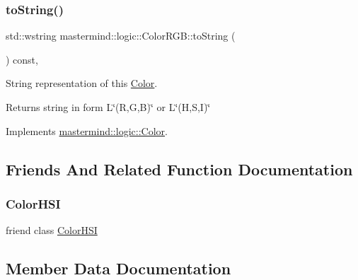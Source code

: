\subsubsection{\texorpdfstring{to\+String()}{toString()}}
{\footnotesize\ttfamily std\+::wstring mastermind\+::logic\+::\+Color\+R\+G\+B\+::to\+String (\begin{DoxyParamCaption}{ }\end{DoxyParamCaption}) const\hspace{0.3cm}{\ttfamily [override]}, {\ttfamily [virtual]}}



String representation of this \hyperlink{classmastermind_1_1logic_1_1_color}{Color}. 

\begin{DoxyReturn}{Returns}
string in form {\ttfamily L\char`\"{}(\+R,\+G,\+B)\char`\"{}} or {\ttfamily L\char`\"{}(\+H,\+S,\+I)\char`\"{}} 
\end{DoxyReturn}


Implements \hyperlink{classmastermind_1_1logic_1_1_color_ab911e1ca9d820b7d97c8e014ff75bc49}{mastermind\+::logic\+::\+Color}.



\subsection{Friends And Related Function Documentation}
\hypertarget{classmastermind_1_1logic_1_1_color_r_g_b_ada143533c2a424e783d7a68a213d6537}{}\label{classmastermind_1_1logic_1_1_color_r_g_b_ada143533c2a424e783d7a68a213d6537} 
\subsubsection{\texorpdfstring{Color\+H\+SI}{ColorHSI}}
{\footnotesize\ttfamily friend class \hyperlink{classmastermind_1_1logic_1_1_color_h_s_i}{Color\+H\+SI}\hspace{0.3cm}{\ttfamily [friend]}}



\subsection{Member Data Documentation}
\hypertarget{classmastermind_1_1logic_1_1_color_r_g_b_a9bfa135c10da9636ed9c0c1310b50731}{}\label{classmastermind_1_1logic_1_1_color_r_g_b_a9bfa135c10da9636ed9c0c1310b50731} 

